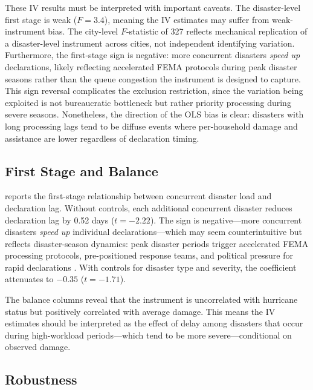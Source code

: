 \documentclass[12pt]{article}
\begin{document}
These IV results must be interpreted with important caveats. The disaster-level first stage is weak ($F = 3.4$), meaning the IV estimates may suffer from weak-instrument bias. The city-level $F$-statistic of 327 reflects mechanical replication of a disaster-level instrument across cities, not independent identifying variation. Furthermore, the first-stage sign is negative: more concurrent disasters \textit{speed up} declarations, likely reflecting accelerated FEMA protocols during peak disaster seasons rather than the queue congestion the instrument is designed to capture. This sign reversal complicates the exclusion restriction, since the variation being exploited is not bureaucratic bottleneck but rather priority processing during severe seasons. Nonetheless, the direction of the OLS bias is clear: disasters with long processing lags tend to be diffuse events where per-household damage and assistance are lower regardless of declaration timing.





\subsection{First Stage and Balance}

 reports the first-stage relationship between concurrent disaster load and declaration lag. Without controls, each additional concurrent disaster reduces declaration lag by 0.52 days ($t = -2.22$). The sign is negative---more concurrent disasters \textit{speed up} individual declarations---which may seem counterintuitive but reflects disaster-season dynamics: peak disaster periods trigger accelerated FEMA processing protocols, pre-positioned response teams, and political pressure for rapid declarations \citep{reeves2011}. With controls for disaster type and severity, the coefficient attenuates to $-0.35$ ($t = -1.71$).

The balance columns reveal that the instrument is uncorrelated with hurricane status but positively correlated with average damage. This means the IV estimates should be interpreted as the effect of delay among disasters that occur during high-workload periods---which tend to be more severe---conditional on observed damage.



\subsection{Robustness}
\end{document}
